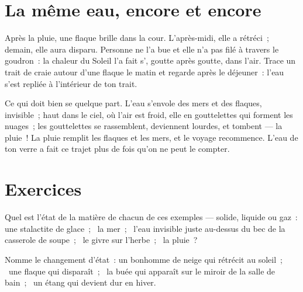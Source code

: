 \section{La même eau, encore et encore}

\begin{example}\label{ex:g2:ice-water-steam:puddle}
Après la pluie, une flaque brille dans la cour. L'après-midi, elle a
rétréci~; demain, elle aura disparu. Personne ne l'a bue et elle n'a
pas filé à travers le goudron~: la chaleur du Soleil l'a fait
s', goutte après goutte, dans l'air. Trace un trait de craie
autour d'une flaque le matin et regarde après le déjeuner~: l'eau
s'est repliée à l'intérieur de ton trait.
\end{example}

\begin{example}\label{ex:g2:ice-water-steam:cycle}
Ce qui  doit bien se  quelque part. L'eau s'envole
des mers et des flaques, invisible~; haut dans le ciel, où l'air est
froid, elle  en gouttelettes qui forment les nuages~; les
gouttelettes se rassemblent, deviennent lourdes, et tombent --- la
pluie~! La pluie remplit les flaques et les mers, et le
voyage recommence. L'eau de ton verre a fait ce trajet plus de fois
qu'on ne peut le compter.
\end{example}

\section{Exercices}

\begin{exercise}[$\star$]\label{exo:g2:ice-water-steam:1}
Quel est l'état de la matière de chacun de ces exemples --- solide,
liquide ou gaz~: une stalactite de glace~; \ la mer~; \ l'eau
invisible juste au-dessus du bec de la casserole de soupe~; \ le
givre sur l'herbe~; \ la pluie~?
\end{exercise}

\begin{exercise}[$\star$]\label{exo:g2:ice-water-steam:2}
Nomme le changement d'état~: un bonhomme de neige qui rétrécit au
soleil~; \ une flaque qui disparaît~; \ la buée qui apparaît sur le
miroir de la salle de bain~; \ un étang qui devient dur en hiver.
\end{exercise}

